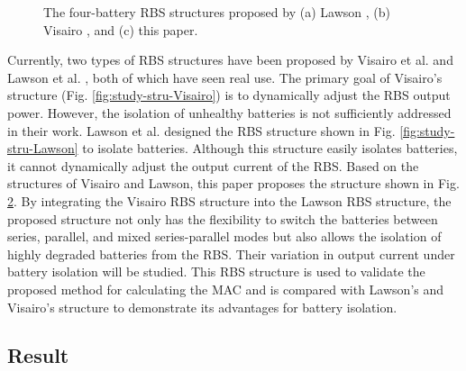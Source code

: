 \documentclass{article}
\begin{document}
\begin{figure}[htbp]
\begin{subfigure}[b]{0.31\textwidth}
        \caption{}
        \label{fig:study-stru-my}
    \end{subfigure}
    \caption{The four-battery RBS structures proposed by (a) Lawson \cite{lawsonSoftwareConfigurableBattery2012}, (b) Visairo \cite{visairoReconfigurableBatteryPack2008}, and (c) this paper.}
\end{figure}

Currently, two types of RBS structures have been proposed by Visairo et al. \cite{visairoReconfigurableBatteryPack2008} and Lawson et al. \cite{lawsonSoftwareConfigurableBattery2012}, both of which have seen real use. 
The primary goal of Visairo's structure (Fig. \ref{fig:study-stru-Visairo}) is to dynamically adjust the RBS output power. However, the isolation of unhealthy batteries is not sufficiently addressed in their work. 
Lawson et al. designed the RBS structure shown in Fig. \ref{fig:study-stru-Lawson} to isolate batteries. 
Although this structure easily isolates batteries, it cannot dynamically adjust the output current of the RBS. 
Based on the structures of Visairo and Lawson, this paper proposes the structure shown in Fig. \ref{fig:study-stru-my}.
By integrating the Visairo RBS structure into the Lawson RBS structure, the proposed structure not only has the flexibility to switch the batteries between series, parallel, and mixed series-parallel modes but also allows the isolation of highly degraded batteries from the RBS.
Their variation in output current under battery isolation will be studied.
This RBS structure is used to validate the proposed method for calculating the MAC and is compared with Lawson's and Visairo's structure to demonstrate its advantages for battery isolation.

\subsection{Result}
\end{document}
